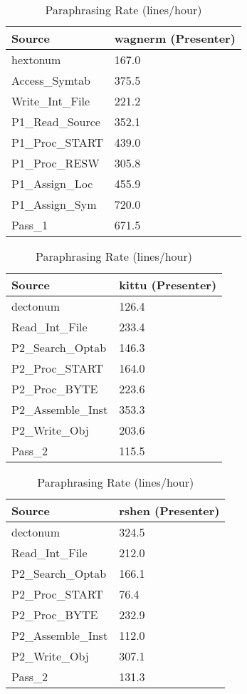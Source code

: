 \begin{table}[hb]
\begin{center}
\begin{tabular}{|l|l|}
\hline
Source & wagnerm (Presenter)\\
\hline
hextonum & 167.0\\
Access\_Symtab & 375.5\\
Write\_Int\_File & 221.2\\
P1\_Read\_Source & 352.1\\
P1\_Proc\_START & 439.0\\
P1\_Proc\_RESW & 305.8\\
P1\_Assign\_Loc & 455.9\\
P1\_Assign\_Sym & 720.0\\
Pass\_1 & 671.5\\
\hline
\end{tabular}
\end{center}
\caption{Paraphrasing Rate (lines/hour)}
\end{table}

\begin{table}[hb]
\begin{center}
\begin{tabular}{|l|l|}
\hline
Source & kittu (Presenter)\\
\hline
dectonum & 126.4\\
Read\_Int\_File & 233.4\\
P2\_Search\_Optab & 146.3\\
P2\_Proc\_START & 164.0\\
P2\_Proc\_BYTE & 223.6\\
P2\_Assemble\_Inst & 353.3\\
P2\_Write\_Obj & 203.6\\
Pass\_2 & 115.5\\
\hline
\end{tabular}
\end{center}
\caption{Paraphrasing Rate (lines/hour)}
\end{table}

\begin{table}[hb]
\begin{center}
\begin{tabular}{|l|l|}
\hline
Source & rshen (Presenter)\\
\hline
dectonum & 324.5\\
Read\_Int\_File & 212.0\\
P2\_Search\_Optab & 166.1\\
P2\_Proc\_START & 76.4\\
P2\_Proc\_BYTE & 232.9\\
P2\_Assemble\_Inst & 112.0\\
P2\_Write\_Obj & 307.1\\
Pass\_2 & 131.3\\
\hline
\end{tabular}
\end{center}
\caption{Paraphrasing Rate (lines/hour)}
\end{table}

